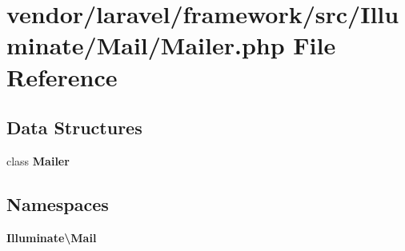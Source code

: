 \section{vendor/laravel/framework/src/\+Illuminate/\+Mail/\+Mailer.php File Reference}
\label{laravel_2framework_2src_2_illuminate_2_mail_2_mailer_8php}
\subsection*{Data Structures}
\begin{DoxyCompactItemize}
\item 
class {\bf Mailer}
\end{DoxyCompactItemize}
\subsection*{Namespaces}
\begin{DoxyCompactItemize}
\item 
 {\bf Illuminate\textbackslash{}\+Mail}
\end{DoxyCompactItemize}
